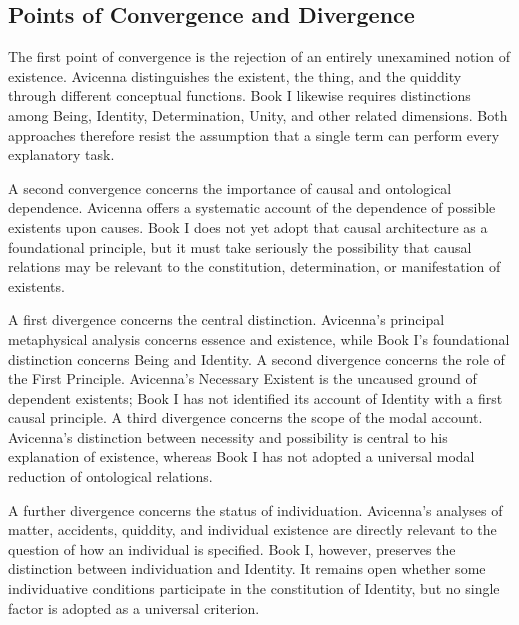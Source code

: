 \subsection{Points of Convergence and Divergence}
\label{subsec:ch08-avicenna-convergence-divergence}

\label{para:VS.B01.P01.C08.S13.SS14.P001}

The first point
of convergence is
the rejection of
an entirely
unexamined notion
of existence.
Avicenna distinguishes
the existent,
the thing,
and the quiddity
through different
conceptual functions.
Book I likewise
requires distinctions
among Being,
Identity,
Determination,
Unity,
and other
related dimensions.
Both approaches
therefore resist
the assumption
that a single
term can perform
every explanatory
task.

\label{para:VS.B01.P01.C08.S13.SS14.P002}

A second convergence
concerns the
importance of
causal and
ontological
dependence.
Avicenna offers
a systematic
account of the
dependence of
possible existents
upon causes.
Book I does
not yet adopt
that causal
architecture as
a foundational
principle, but
it must take
seriously the
possibility that
causal relations
may be relevant
to the constitution,
determination,
or manifestation
of existents.

\label{para:VS.B01.P01.C08.S13.SS14.P003}

A first divergence
concerns the
central distinction.
Avicenna's principal
metaphysical analysis
concerns essence
and existence,
while Book I's
foundational
distinction concerns
Being and Identity.
A second divergence
concerns the
role of the
First Principle.
Avicenna's Necessary
Existent is
the uncaused
ground of
dependent existents;
Book I has
not identified
its account
of Identity
with a first
causal principle.
A third divergence
concerns the
scope of the
modal account.
Avicenna's distinction
between necessity
and possibility
is central
to his
explanation of
existence, whereas
Book I has
not adopted
a universal
modal reduction
of ontological
relations.

\label{para:VS.B01.P01.C08.S13.SS14.P004}

A further divergence
concerns the
status of
individuation.
Avicenna's analyses
of matter,
accidents,
quiddity,
and individual
existence are
directly relevant
to the question
of how an
individual is
specified. Book I,
however, preserves
the distinction
between individuation
and Identity.
It remains open
whether some
individuative
conditions participate
in the constitution
of Identity,
but no
single factor
is adopted
as a universal
criterion.

